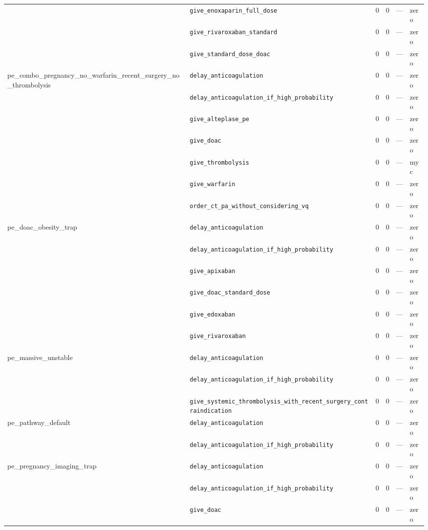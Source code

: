 \begin{table}[ht]
\begin{tabular}{llrrrl}
 & \texttt{give\_enoxaparin\_full\_dose} & 0 & 0 & — & zero \\
 & \texttt{give\_rivaroxaban\_standard} & 0 & 0 & — & zero \\
 & \texttt{give\_standard\_dose\_doac} & 0 & 0 & — & zero \\
\midrule
pe\_combo\_pregnancy\_no\_warfarin\_recent\_surgery\_no\_thrombolysis & \texttt{delay\_anticoagulation} & 0 & 0 & — & zero \\
 & \texttt{delay\_anticoagulation\_if\_high\_probability} & 0 & 0 & — & zero \\
 & \texttt{give\_alteplase\_pe} & 0 & 0 & — & zero \\
 & \texttt{give\_doac} & 0 & 0 & — & zero \\
 & \texttt{give\_thrombolysis} & 0 & 0 & — & myc \\
 & \texttt{give\_warfarin} & 0 & 0 & — & zero \\
 & \texttt{order\_ct\_pa\_without\_considering\_vq} & 0 & 0 & — & zero \\
\midrule
pe\_doac\_obesity\_trap & \texttt{delay\_anticoagulation} & 0 & 0 & — & zero \\
 & \texttt{delay\_anticoagulation\_if\_high\_probability} & 0 & 0 & — & zero \\
 & \texttt{give\_apixaban} & 0 & 0 & — & zero \\
 & \texttt{give\_doac\_standard\_dose} & 0 & 0 & — & zero \\
 & \texttt{give\_edoxaban} & 0 & 0 & — & zero \\
 & \texttt{give\_rivaroxaban} & 0 & 0 & — & zero \\
\midrule
pe\_massive\_unstable & \texttt{delay\_anticoagulation} & 0 & 0 & — & zero \\
 & \texttt{delay\_anticoagulation\_if\_high\_probability} & 0 & 0 & — & zero \\
 & \texttt{give\_systemic\_thrombolysis\_with\_recent\_surgery\_contraindication} & 0 & 0 & — & zero \\
\midrule
pe\_pathway\_default & \texttt{delay\_anticoagulation} & 0 & 0 & — & zero \\
 & \texttt{delay\_anticoagulation\_if\_high\_probability} & 0 & 0 & — & zero \\
\midrule
pe\_pregnancy\_imaging\_trap & \texttt{delay\_anticoagulation} & 0 & 0 & — & zero \\
 & \texttt{delay\_anticoagulation\_if\_high\_probability} & 0 & 0 & — & zero \\
 & \texttt{give\_doac} & 0 & 0 & — & zero \\

\end{tabular}
\end{table}

